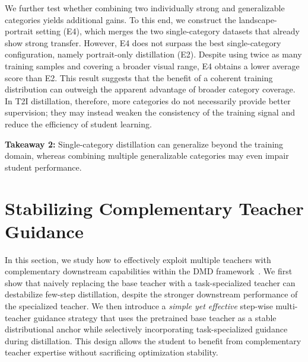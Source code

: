 \documentclass{article}
\begin{document}
We further test whether combining two individually strong and generalizable categories yields additional gains. To this end, we construct the landscape-portrait setting (E4), which merges the two single-category datasets that already show strong transfer. However, E4 does not surpass the best single-category configuration, namely portrait-only distillation (E2). Despite using twice as many training samples and covering a broader visual range, E4 obtains a lower average score than E2. This result suggests that the benefit of a coherent training distribution can outweigh the apparent advantage of broader category coverage. In T2I distillation, therefore, more categories do not necessarily provide better supervision; they may instead weaken the consistency of the training signal and reduce the efficiency of student learning.

\begin{tcolorbox}[
colback=blue!3,
colframe=blue!70!black,
boxrule=0.8pt,
arc=6pt,
left=6pt,
right=6pt,
top=4pt,
bottom=4pt
]
\textbf{Takeaway 2:} Single-category distillation can generalize beyond the training domain, whereas combining multiple generalizable categories may even impair student performance.
\end{tcolorbox}





\section{Stabilizing Complementary Teacher Guidance}
In this section, we study how to effectively exploit multiple teachers with complementary downstream capabilities within the DMD framework~\citep{yin2024improved}. We first show that naively replacing the base teacher with a task-specialized teacher can destabilize few-step distillation, despite the stronger downstream performance of the specialized teacher. We then introduce a \textit{simple yet effective} step-wise multi-teacher guidance strategy that uses the pretrained base teacher as a stable distributional anchor while selectively incorporating task-specialized guidance during distillation. This design allows the student to benefit from complementary teacher expertise without sacrificing optimization stability.
\end{document}
